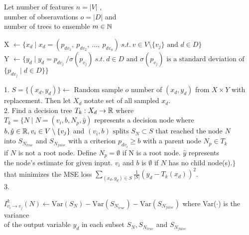 \clearpage
\begin{algorithm}[H]
    \DontPrintSemicolon

    Let number of features $n = |V|$ , \\
    number of obseravations $o = |D|$ and \\
    number of trees to ensemble $ m \in \Bbb N$

     {
        X $\gets \{ x_d \mid x_d = (p_{dv_1},\: p_{dv_2},\: \ldots, \:p_{dv_{n}}) \: s.t. \: v \in V \setminus{\{v_j\}} \text{ and } d \in D \} \:$  \\
        Y $\gets \{ y_d  \mid y_d = p_{dv_j} \: / \sigma(p_{v_j}) \: s.t. \: d \in D \text{ and } \sigma(p_{v_j}) \text{ is a standard deviation of }$ \\
        $\{ p_{dv_j} \mid d \in D \} \}$\\

         {
            1. $S = \{(x_d, y_d)\} \gets $ Random sample $o$ number of $(x_d, y_d)$ from $X \times Y$ with replacement. Then let $X_d$ notate set of all sampled $x_d$. \\
            2. Find a decision tree $T_k: X_d \to \Bbb R$ where\\
            $T_k = \{ N \mid N = (v_i, b, N_p, \hat{y}) $ represents a decision node where \\ 
            $ b, \hat{y} \in \Bbb R, v_i \in V \setminus{\{v_j\}} $ and $(v_i, b) \text{ splits } S_N \subset S \text{ that reached the node } N $\\
            into $S_{N_{true}}$ and $S_{N_{false}}$ with a criterion $p_{dv_i} \ge b$ with a parent node $ N_p \in T_k$ \\             if $N$ is not a root node. Define $N_p = \emptyset$ if N is a root node. $\hat{y}$ represents \\
            the node's estimate for given input. $v_i$ and $b$ is $\emptyset$ if $N$ has no child node(s).$\}$\\
            that minimizes the MSE loss $\sum_{(x_d, y_d) \in S} \frac{1}{|S|}(y_d - T_k(x_d))^2$.\\
            3.
             {
                {
                    $I^k_{v_i \to v_j}(N) \gets \text{Var}(S_N) - \text{Var}(S_{N_{true}}) - \text{Var}(S_{N_{false}})$ where Var($\cdot$) is the variance\\
                    of the output variable $y_d$ in each subset $S_N, S_{N_{true}}$ and $S_{N_{false}}$           
                } 

}}}
\end{algorithm}
